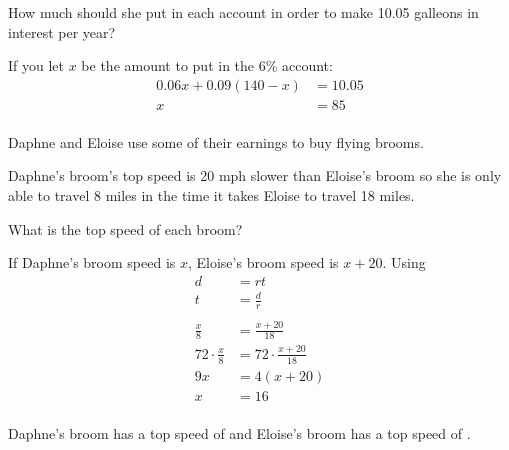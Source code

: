 \documentclass[letterpaper, landscape]{exam}
\begin{document}
\begin{questions}
    How much should she put in each account in order to make 10.05 galleons in interest per year?

    \begin{solution}
      If you let $x$ be the amount to put in the 6\% account:
      \begin{align*}
        0.06x + 0.09( 140 - x ) & = 10.05 \\
        x                       & = \boxed{ 85 } \\
      \end{align*}
    \end{solution}





    \bonusquestion[15] 
      Daphne and Eloise use some of their earnings to buy flying brooms. 
      
      Daphne's broom's top speed is 20 mph slower than Eloise's broom so she is only able to travel
      8 miles in the time it takes Eloise to travel 18 miles. 
      
      What is the top speed of each broom?

      \ifprintanswers{}
        \newpage
      \fi

      \begin{solution}
        If Daphne's broom speed is $x$, Eloise's broom speed is $x + 20$. Using 
        \begin{align*}
          d & = rt \\
          t & = \frac{d}{r} \\
          \\
          \frac{x}{8}          & = \frac{x + 20}{18} \\
          72 \cdot \frac{x}{8} & = 72 \cdot \frac{x + 20}{18} \\
          9x                   & = 4 (x + 20) \\
          x                    & = 16 \\
        \end{align*}

        Daphne's broom has a top speed of  and Eloise's broom has a top speed of
        .
      \end{solution}

  \end{questions}
\end{document}
